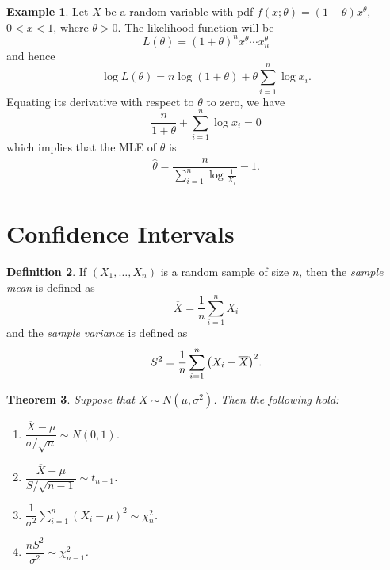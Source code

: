 \documentclass[svgnames, a5paper]{article}
\newtheorem{Theorem}{Theorem}[section]
\theoremstyle{definition}
\newtheorem{Definition}[Theorem]{Definition}
\newtheorem{Example}[Theorem]{Example}
\theoremstyle{remark}
\begin{document}
\begin{Example}
Let $X$ be a random variable with pdf $f(x; \theta) = (1 + \theta) x^{\theta}$, $0 < x < 1$, where $\theta > 0$. The likelihood function will be
\begin{equation*}
L(\theta) = (1 + \theta)^n x_1^\theta \cdots x_n^\theta
\end{equation*}
and hence
\begin{equation*}
\log L(\theta) = n \log(1 + \theta) + \theta \sum_{i = 1}^n \log x_i.
\end{equation*}
Equating its derivative with respect to $\theta$ to zero, we have
\begin{equation*}
\dfrac{n}{1 + \theta} + \sum_{i = 1}^n \log x_i = 0
\end{equation*}
which implies that the MLE of $\theta$ is
\begin{align*}
\hat\theta = \dfrac{n}{\sum\limits_{i = 1}^n \log \frac 1 {X_i}} - 1.
\end{align*}
\end{Example} 

\section{Confidence Intervals}\label{sec:CI}

\begin{Definition}
If $(X_1, \ldots, X_n)$ is a random sample of size $n$, then the \emph{sample mean} is defined as
\begin{equation*}
\overline X = \dfrac 1 n \sum_{i = 1}^n X_i
\end{equation*}
and the \emph{sample variance} is defined as
\begin{equation*}
S^2 = \dfrac 1 n \sum_{i = 1}^n \pqty{X_i - \overline X}^2.
\end{equation*}
\end{Definition}

\begin{Theorem}
Suppose that $X \sim N(\mu, \sigma^2)$. Then the following hold:
\begin{enumerate}
\item $\dfrac{\overline X - \mu}{\sigma / \sqrt n} \sim N(0, 1)$.
\item $\dfrac{\overline X - \mu}{S/\sqrt{n - 1}} \sim t_{n-1}$.
\item $\dfrac 1 {\sigma^2} \displaystyle\sum_{i=1}^n (X_i - \mu)^2 \sim \chi^2_n$.
\item $\dfrac{nS^2}{\sigma^2} \sim \chi^2_{n - 1}$.
\end{enumerate}
\end{Theorem}
\end{document}
